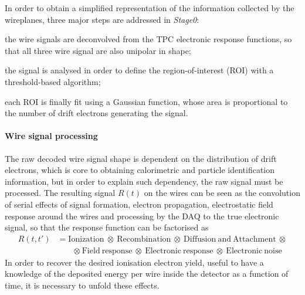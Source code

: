In order to obtain a simplified representation of the information collected by the wireplanes, three major steps are addressed in \emph{Stage0}: \begin{inparaenum}
    \item the wire signals are deconvolved from the TPC electronic response functions, so that all three wire signal are also unipolar in shape;
    \item the signal is analysed in order to define the region-of-interest (ROI) with a threshold-based algorithm; 
    \item each ROI is finally fit using a Gaussian function, whose area is proportional to the number of drift electrons generating the signal. 
\end{inparaenum}

\paragraph{Wire signal processing} The raw decoded wire signal shape is dependent on the distribution of drift electrons, which is core to obtaining calorimetric and particle identification information, but in order to explain such dependency, the raw signal must be processed. The resulting signal $R(t)$ on the wires can be seen as the convolution of serial effects of signal formation, electron propagation, electrostatic field response around the wires and processing by the DAQ to the true electronic signal, so that the response function can be factorised as \begin{equation}
    \begin{aligned}
        R(t, t')&=\mathrm{Ionization\ \otimes\ Recombination\ \otimes\ Diffusion\ and\ Attachment\ \otimes} \\
        &\quad \quad \mathrm{\otimes\ Field\ response\ \otimes\ Electronic\ response\ \otimes\ Electronic\ noise}
    \end{aligned} 
\end{equation} In order to recover the desired ionisation electron yield, useful to have a knowledge of the deposited energy per wire inside the detector as a function of time, it is necessary to unfold these effects. 

